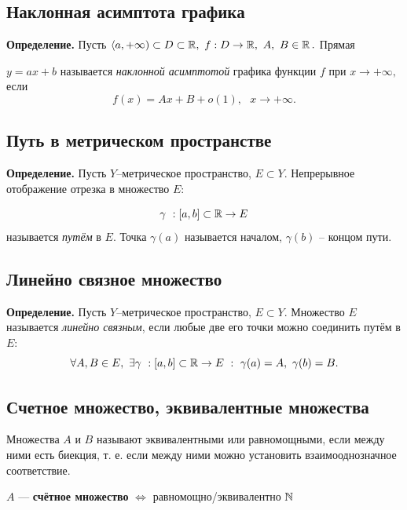 \subsection{Наклонная асимптота графика}
\textbf{Определение.} Пусть $\langle a, +\infty) \subset D \subset \operatorname*{\mathbb{R}},\ f: D \to \operatorname*{\mathbb{R}},\ A,\ B \in \operatorname*{\mathbb{R}}.$ Прямая 

$y = ax+b$ называется \textit{наклонной асимптотой} графика функции $f$ при $x \to +\infty,$ если $$f(x) = A x + B + o(1),\ \ \ x\to+\infty.$$

\subsection{Путь в метрическом пространстве}
\textbf{Определение.} Пусть $Y$--метрическое пространство, $E \subset Y.$ Непрерывное отображение отрезка в множество $E$:

$$\gamma \ : [a, b] \subset \operatorname*{\mathbb{R}} \to E$$
называется \textit{путём} в $E$. Точка $\gamma(a)$ называется началом, $\gamma(b)$ -- концом пути.
\subsection{Линейно связное множество}
\textbf{Определение.} Пусть $Y$--метрическое пространство, $E \subset Y.$ Множество $E$ называется \textit{линейно связным}, если любые две его точки можно соединить путём в $E$: $$\forall A, B \in E,\ \exists\gamma \ : [a, b] \subset \operatorname*{\mathbb{R}} \to E\ :\ \gamma(a) = A,\ \gamma(b) = B.$$
\newpage
{}
\subsection{Счетное множество, эквивалентные множества}
\begin{definition}
    Множества $A$ и $B$ называют эквивалентными или равномощными, если между ними есть биекция, т. е. если между ними можно установить взаимооднозначное соответствие.
\end{definition}
\begin{definition}
 $A$ --- \textbf{счётное множество} $\Leftrightarrow$ равномощно/эквивалентно $\operatorname*{\mathbb{N}}$
\end{definition}

\newpage
